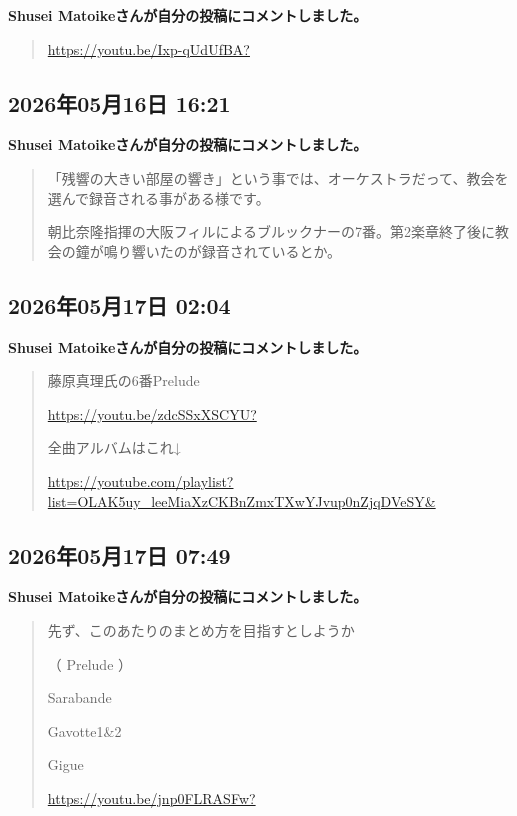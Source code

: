 \textbf{Shusei Matoikeさんが自分の投稿にコメントしました。}

\begin{quote}
\url{https://youtu.be/Ixp-qUdUfBA?}
\end{quote}

\subsection*{2026年05月16日 16:21}

\textbf{Shusei Matoikeさんが自分の投稿にコメントしました。}

\begin{quote}
「残響の大きい部屋の響き」という事では、オーケストラだって、教会を選んで録音される事がある様です。

朝比奈隆指揮の大阪フィルによるブルックナーの7番。第2楽章終了後に教会の鐘が鳴り響いたのが録音されているとか。
\end{quote}

\subsection*{2026年05月17日 02:04}

\textbf{Shusei Matoikeさんが自分の投稿にコメントしました。}

\begin{quote}
藤原真理氏の6番Prelude

\url{https://youtu.be/zdcSSxXSCYU?}

全曲アルバムはこれ↓

\url{https://youtube.com/playlist?list=OLAK5uy_leeMiaXzCKBnZmxTXwYJvup0nZjqDVeSY&}
\end{quote}

\subsection*{2026年05月17日 07:49}

\textbf{Shusei Matoikeさんが自分の投稿にコメントしました。}

\begin{quote}
先ず、このあたりのまとめ方を目指すとしようか

（ Prelude ）

Sarabande

Gavotte1\&2

Gigue

\url{https://youtu.be/jnp0FLRASFw?}
\end{quote}

